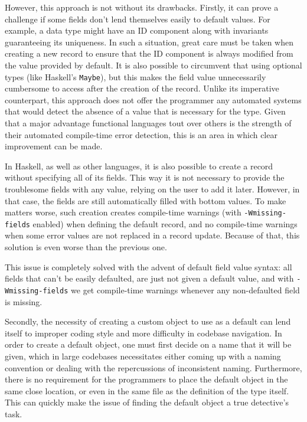 \documentclass[en]{pracamgr}
\newcommand{\code}[1]{\lstinline[breaklines=true]{#1}}
\begin{document}
However, this approach is not without its drawbacks.
Firstly, it can prove a challenge if some fields don't lend themselves easily to default values. 
For example, a data type might have an ID component along with invariants guaranteeing its uniqueness. 
In such a situation, great care must be taken when creating a new record to ensure that the ID component is always modified from the value provided by default.
It is also possible to circumvent that using optional types (like Haskell's \code{Maybe}), 
but this makes the field value unnecessarily cumbersome to access after the creation of the record.
Unlike its imperative counterpart, this approach does not offer the programmer any automated systems 
that would detect the absence of a value that is necessary for the type.
Given that a major advantage functional languages tout over others is the strength of their automated compile-time error detection, 
this is an area in which clear improvement can be made.

In Haskell, as well as other languages, it is also possible to create a record without specifying all of its fields.
This way it is not necessary to provide the troublesome fields with any value, relying on the user to add it later.
However, in that case, the fields are still automatically filled with bottom values.
To make matters worse, such creation creates compile-time warnings (with \code{-Wmissing-fields} enabled) when defining the default record, 
and no compile-time warnings when some error values are not replaced in a record update.
Because of that, this solution is even worse than the previous one.

This issue is completely solved with the advent of default field value syntax: all fields that can't be easily defaulted, 
are just not given a default value, and with \code{-Wmissing-fields} we get compile-time warnings whenever any non-defaulted field is missing. 

Secondly, the necessity of creating a custom object to use as a default can lend itself to improper coding style and more difficulty in codebase navigation.
In order to create a default object, one must first decide on a name that it will be given, which in large codebases 
necessitates either coming up with a naming convention or dealing with the repercussions of inconsistent naming. 
Furthermore, there is no requirement for the programmers to place the default object in the same close location, 
or even in the same file as the definition of the type itself.
This can quickly make the issue of finding the default object a true detective's task. 
\end{document}
